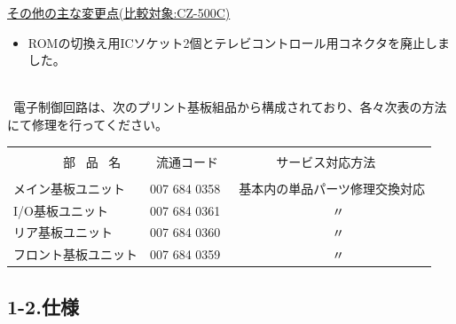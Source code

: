 \documentclass[twoside,a4paper,12pt]{article}
\begin{document}
\uline{その他の主な変更点(比較対象:CZ-500C)}

\begin{itemize}[leftmargin=25mm, itemsep=-1mm, topsep=1mm]
\item
ROMの切換え用ICソケット2個とテレビコントロール用コネクタを廃止しました。\\
\end{itemize}

\ \\[-3mm]

\scriptsize \ 電子制御回路は、次のプリント基板組品から構成されており、各々次表の方法にて修理を行ってください。\\[-2mm]

\small

\setlength{\arrayrulewidth}{0.5mm}
\setlength{\tabcolsep}{2mm}
\begin{tabular}{|p{55mm}|p{40mm}|p{62mm}|}
\hline
& & \\[-2mm]
\ \ \ \ \ \ \ \ 部 \ 品 \ 名 & \ 流通コード & \ \ \ \ \ \ \ サービス対応方法\\
\hline
& & \\[-4mm]
メイン基板ユニット & 007 684 0358 & \ 基本内の単品パーツ修理交換対応\\
I/O基板ユニット & 007 684 0361 & \ \ \ \ \ \ \ \ \ \ \ \ \ \ \ \ 〃\\
リア基板ユニット & 007 684 0360 & \ \ \ \ \ \ \ \ \ \ \ \ \ \ \ \ 〃\\
フロント基板ユニット & 007 684 0359 & \ \ \ \ \ \ \ \ \ \ \ \ \ \ \ \ 〃\\[4mm]
\hline
\end{tabular}

\newpage

\subsection*{1-2.仕様}
\end{document}
